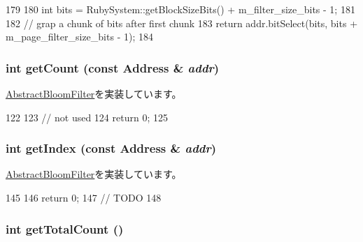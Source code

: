 \begin{DoxyCode}
179 {
180     int bits = RubySystem::getBlockSizeBits() + m_filter_size_bits - 1;
181 
182     // grap a chunk of bits after first chunk
183     return addr.bitSelect(bits, bits + m_page_filter_size_bits - 1);
184 }
\end{DoxyCode}
\hypertarget{classMultiGrainBloomFilter_abb722634d5846105b673e9496df8d062}{
\subsubsection[{getCount}]{\setlength{\rightskip}{0pt plus 5cm}int getCount (const {\bf Address} \& {\em addr})}}
\label{classMultiGrainBloomFilter_abb722634d5846105b673e9496df8d062}


\hyperlink{classAbstractBloomFilter_ab6253919ea6ff1b2c17506742b34147d}{AbstractBloomFilter}を実装しています。


\begin{DoxyCode}
122 {
123     // not used
124     return 0;
125 }
\end{DoxyCode}
\hypertarget{classMultiGrainBloomFilter_a19f42f6f2fc3501021b768f0df8108b2}{
\subsubsection[{getIndex}]{\setlength{\rightskip}{0pt plus 5cm}int getIndex (const {\bf Address} \& {\em addr})}}
\label{classMultiGrainBloomFilter_a19f42f6f2fc3501021b768f0df8108b2}


\hyperlink{classAbstractBloomFilter_a4dd174ae24a8237d41cf0b02c78b896d}{AbstractBloomFilter}を実装しています。


\begin{DoxyCode}
145 {
146     return 0;
147     // TODO
148 }
\end{DoxyCode}
\hypertarget{classMultiGrainBloomFilter_a97f66183ea41a7c123bab9dd5313a74a}{
\subsubsection[{getTotalCount}]{\setlength{\rightskip}{0pt plus 5cm}int getTotalCount ()}}
\label{classMultiGrainBloomFilter_a97f66183ea41a7c123bab9dd5313a74a}


